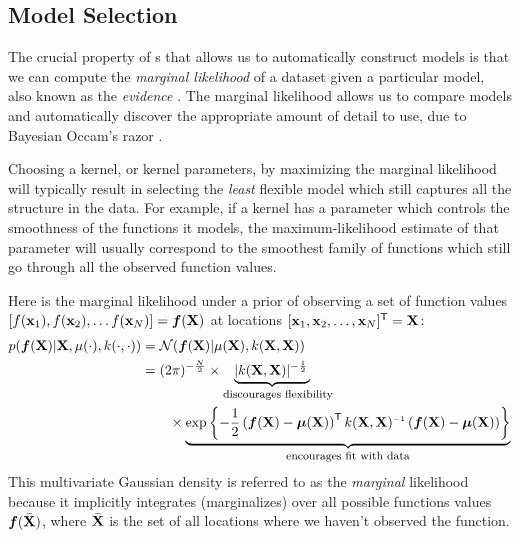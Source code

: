 \subsection{Model Selection}

The crucial property of \gp{}s that allows us to automatically construct models is that we can compute the \emph{marginal likelihood} of a dataset given a particular model, also known as the \emph{evidence} \citep{mackay1992bayesian}.
The marginal likelihood allows us to compare models and automatically discover the appropriate amount of detail to use, due to Bayesian Occam's razor \citep{rasmussen2001occam,mackay2003information}.

Choosing a kernel, or kernel parameters, by maximizing the marginal likelihood will typically result in selecting the \emph{least} flexible model which still captures all the structure in the data.
For example, if a kernel has a parameter which controls the smoothness of the functions it models, the maximum-likelihood estimate of that parameter will usually correspond to the smoothest family of functions which still go through all the observed function values.

Here is the marginal likelihood under a \gp{} prior of observing a set of function values $\left[ f({\bf{x}}_1), f({\bf{x}}_2), \ldots f({\bf{x}}_N)  \right] = \boldsymbol{f}(\mathbf{X})$ at locations $[{\bf{x}}_1, {\bf{x}}_2, \ldots, {\bf{x}}_N]^{\mathsf{T}} = \mathbf{X}$:
%
\begin{align}
p(\funcval | \vX, \mu(\cdot), k(\cdot, \cdot)) & = \N{\funcval}{\mu(\vX)}{k(\vX, \vX)} \label{eq:gp_marg_lik} \\
& = (2\pi)^{-\frac{N}{2}} \times \underwrite{ |k(\vX, \vX)|^{-\frac{1}{2}}\,}{\parbox{2.5cm}{\parbox{3.5cm}{\footnotesize discourages flexibility}}} \nonumber \\
 & \qquad \times \underwrite{\exp \left\{ -\frac{1}{2} \left( \funcval - \boldsymbol\mu(\vX) \right)\tra k(\vX, \vX)\inv \left(\funcval - \boldsymbol\mu(\vX) \right) \right\}}{\footnotesize encourages fit with data} \nonumber
\end{align}
%
This multivariate Gaussian density is referred to as the \emph{marginal} likelihood because it implicitly integrates (marginalizes) over all possible functions values $\boldsymbol{f}( \bar {\mathbf{X}})$, where $\bar {\mathbf{X}}$ is the set of all locations where we haven't observed the function.

